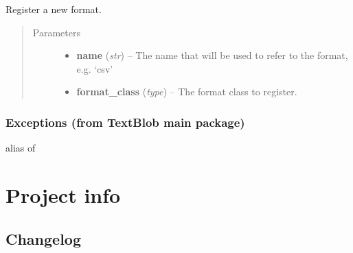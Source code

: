 \documentclass[letterpaper,10pt,english]{sphinxmanual}
\begin{document}
\begin{fulllineitems}
\label{api_reference:textblob.formats.register}
Register a new format.
\begin{quote}\begin{description}
\item[{Parameters}] \leavevmode\begin{itemize}
\item {} 
\textbf{name} (\emph{str}) -- The name that will be used to refer to the format, e.g. `csv'

\item {} 
\textbf{format\_class} (\emph{type}) -- The format class to register.

\end{itemize}

\end{description}\end{quote}

\end{fulllineitems}



\subsection{Exceptions (from TextBlob main package)}
\label{api_reference:module-textblob.exceptions}\label{api_reference:exceptions-from-textblob-main-package}

\begin{fulllineitems}
\label{api_reference:textblob.exceptions.MissingCorpusException}
alias of 

\end{fulllineitems}



\chapter{Project info}
\label{index:project-info}\label{index:id4}

\section{Changelog}
\label{changelog:id1}\label{changelog::doc}\label{changelog:changelog}
\end{document}
